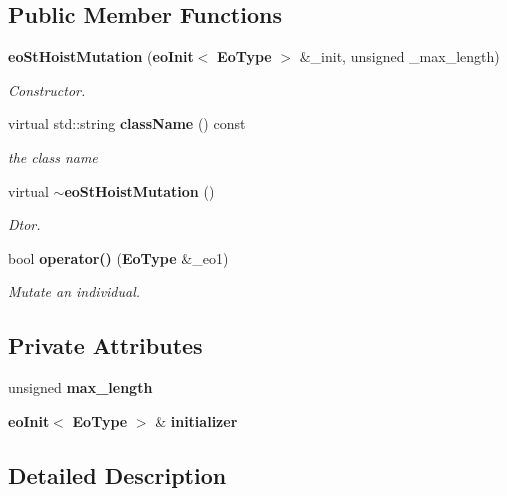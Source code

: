 \subsection*{Public Member Functions}
\begin{CompactItemize}
\item 
{\bf eo\-St\-Hoist\-Mutation} ({\bf eo\-Init}$<$ {\bf Eo\-Type} $>$ \&\_\-init, unsigned \_\-max\_\-length)
\begin{CompactList}\small\item\em Constructor. \item\end{CompactList}\item 
virtual std::string {\bf class\-Name} () const \label{classeo_st_hoist_mutation_a1}

\begin{CompactList}\small\item\em the class name \item\end{CompactList}\item 
virtual {\bf $\sim$eo\-St\-Hoist\-Mutation} ()\label{classeo_st_hoist_mutation_a2}

\begin{CompactList}\small\item\em Dtor. \item\end{CompactList}\item 
bool {\bf operator()} ({\bf Eo\-Type} \&\_\-eo1)
\begin{CompactList}\small\item\em Mutate an individual. \item\end{CompactList}\end{CompactItemize}
\subsection*{Private Attributes}
\begin{CompactItemize}
\item 
unsigned {\bf max\_\-length}\label{classeo_st_hoist_mutation_r0}

\item 
{\bf eo\-Init}$<$ {\bf Eo\-Type} $>$ \& {\bf initializer}\label{classeo_st_hoist_mutation_r1}

\end{CompactItemize}


\subsection{Detailed Description}
